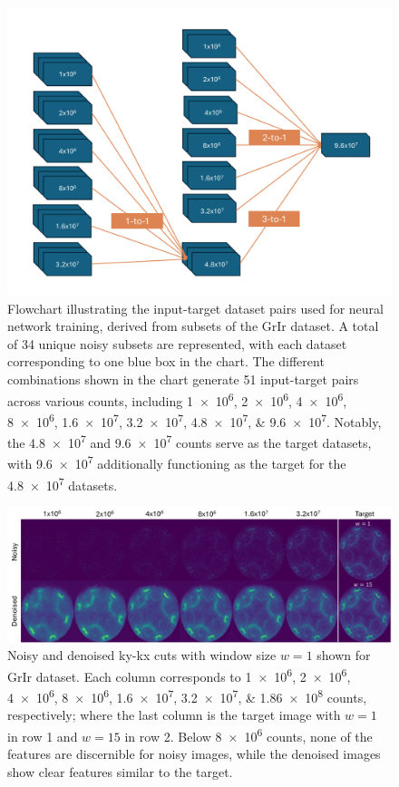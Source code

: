 \begin{figure}[h]
    \centering
    \includegraphics[width=1\linewidth]{images/training_flowchart.pdf}
    \caption{Flowchart illustrating the input-target dataset pairs used for neural network training, derived from subsets of the \gls{GrIr} dataset. A total of \num{34} unique noisy subsets are represented, with each dataset corresponding to one blue box in the chart. The different combinations shown in the chart generate \num{51} input-target pairs across various counts, including \numlist{1e6;2e6;4e6;8e6;1.6e7;3.2e7;4.8e7;9.6e7}. Notably, the \num{4.8e7} and \num{9.6e7} counts serve as the target datasets, with \num{9.6e7} additionally functioning as the target for the \num{4.8e7} datasets.}
    \label{fig:training-data}
\end{figure}

\begin{figure}[h]
    \centering
    \includegraphics[width=1\linewidth]{images/images_noisy_denoised_with_target.pdf}
    \caption{Noisy and denoised \gls{ky}-\gls{kx} cuts with window size $w=1$ shown for \gls{GrIr} dataset. Each column corresponds to \numlist{1e6;2e6;4e6;8e6;1.6e7;3.2e7;1.86e8} counts, respectively; where the last column is the target image with $w=1$ in row 1 and $w=15$ in row 2. Below \num{8e6} counts, none of the features are discernible for noisy images, while the denoised images show clear features similar to the target.}
    \label{fig:images-noisy-denoised-training}
\end{figure}


